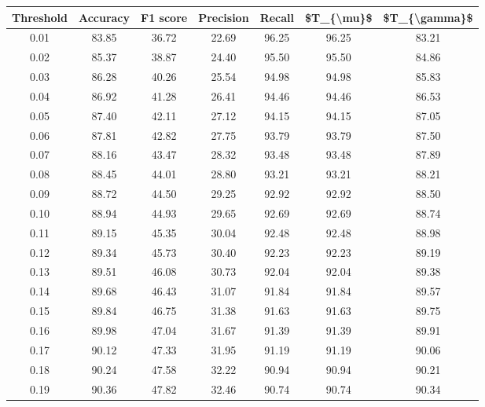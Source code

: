 \begin{tabular}{|c|c|c|c|c|c|c|}
\hline
 Threshold &  Accuracy &  F1 score &  Precision &  Recall &  \$T\_\{\textbackslash mu\}\$ &  \$T\_\{\textbackslash gamma\}\$ \\
\hline
      0.01 &     83.85 &     36.72 &      22.69 &   96.25 &      96.25 &         83.21 \\
      0.02 &     85.37 &     38.87 &      24.40 &   95.50 &      95.50 &         84.86 \\
      0.03 &     86.28 &     40.26 &      25.54 &   94.98 &      94.98 &         85.83 \\
      0.04 &     86.92 &     41.28 &      26.41 &   94.46 &      94.46 &         86.53 \\
      0.05 &     87.40 &     42.11 &      27.12 &   94.15 &      94.15 &         87.05 \\
      0.06 &     87.81 &     42.82 &      27.75 &   93.79 &      93.79 &         87.50 \\
      0.07 &     88.16 &     43.47 &      28.32 &   93.48 &      93.48 &         87.89 \\
      0.08 &     88.45 &     44.01 &      28.80 &   93.21 &      93.21 &         88.21 \\
      0.09 &     88.72 &     44.50 &      29.25 &   92.92 &      92.92 &         88.50 \\
      0.10 &     88.94 &     44.93 &      29.65 &   92.69 &      92.69 &         88.74 \\
      0.11 &     89.15 &     45.35 &      30.04 &   92.48 &      92.48 &         88.98 \\
      0.12 &     89.34 &     45.73 &      30.40 &   92.23 &      92.23 &         89.19 \\
      0.13 &     89.51 &     46.08 &      30.73 &   92.04 &      92.04 &         89.38 \\
      0.14 &     89.68 &     46.43 &      31.07 &   91.84 &      91.84 &         89.57 \\
      0.15 &     89.84 &     46.75 &      31.38 &   91.63 &      91.63 &         89.75 \\
      0.16 &     89.98 &     47.04 &      31.67 &   91.39 &      91.39 &         89.91 \\
      0.17 &     90.12 &     47.33 &      31.95 &   91.19 &      91.19 &         90.06 \\
      0.18 &     90.24 &     47.58 &      32.22 &   90.94 &      90.94 &         90.21 \\
      0.19 &     90.36 &     47.82 &      32.46 &   90.74 &      90.74 &         90.34 \\

\end{tabular}
